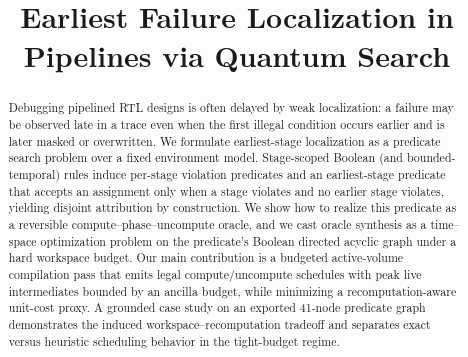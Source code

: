\documentclass[conference]{IEEEtran}
\begin{document}
\title{Earliest Failure Localization in Pipelines via Quantum Search}

\author{
\and
{}
}

\maketitle


\begin{abstract}
Debugging pipelined RTL designs is often delayed by weak localization: a failure may be observed late in a trace even when the first illegal condition occurs earlier and is later masked or overwritten. We formulate earliest-stage localization as a predicate search problem over a fixed environment model. Stage-scoped Boolean (and bounded-temporal) rules induce per-stage violation predicates and an earliest-stage predicate that accepts an assignment only when a stage violates and no earlier stage violates, yielding disjoint attribution by construction. We show how to realize this predicate as a reversible compute--phase--uncompute oracle, and we cast oracle synthesis as a time--space optimization problem on the predicate’s Boolean directed acyclic graph under a hard workspace budget. Our main contribution is a budgeted active-volume compilation pass that emits legal compute/uncompute schedules with peak live intermediates bounded by an ancilla budget, while minimizing a recomputation-aware unit-cost proxy. A grounded case study on an exported 41-node predicate graph demonstrates the induced workspace--recomputation tradeoff and separates exact versus heuristic scheduling behavior in the tight-budget regime.
\end{abstract}
\end{document}
